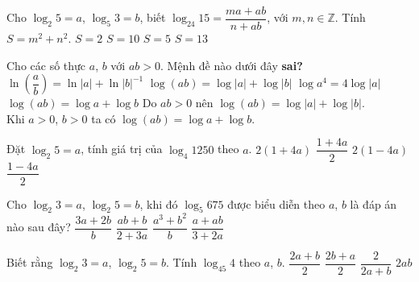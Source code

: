 \begin{ex}
	Cho $\log_2 5=a$, $\log_5 3=b$, biết $\log_{24} 15=\dfrac{ma+ab}{n+ab}$, với $m, n\in \mathbb{Z}$. Tính $S=m^2+n^2$.
	\choice
	{$S=2$}
	{\True $S=10$}
	{$S=5$}
	{$S=13$}
\end{ex}
\begin{ex}
	Cho các số thực $a$, $b$ với $ab>0$. Mệnh đề nào dưới đây \textbf{sai?}
	\choice
	{$\ln\left(\dfrac{a}{b}\right)=\ln|a|+\ln|b|^{-1}$}
	{$\log(ab)=\log|a|+\log|b|$}
	{$\log a^4=4\log|a|$}
	{\True $\log(ab)=\log a+\log b$}
	\loigiai
	{
		Do $ab>0$ nên $\log(ab)=\log|a|+\log|b|$.\\
		Khi $a>0$, $b>0$ ta có $\log(ab)=\log a+\log b$.
	}
\end{ex}

\begin{ex}
	Đặt $\log_2 5=a$, tính giá trị của $\log_4 1250$ theo $a$.
	\choice
	{$2(1+4a)$}
	{\True $\dfrac{1+4a}{2}$}
	{$2(1-4a)$}
	{$\dfrac{1-4a}{2}$}
\end{ex}
\begin{ex}
	Cho $\log_2 3 = a$, $\log_2 5 = b$, khi đó $\log_5 675$ được biểu diễn theo $a$, $b$ là đáp án nào sau đây?
	\choice
	{\True $\dfrac{3a + 2b}{b} $}
	{$ \dfrac{ab + b}{2+3a} $}
	{$ \dfrac{a^3 + b^2}{b} $}
	{ $\dfrac{a + ab}{3 + 2a}$ }
\end{ex}

\begin{ex}
	Biết rằng $\log_2 3=a$, $\log_2 5=b$. Tính $\log_{45} 4$ theo $a$, $b$.
	\choice
	{$\dfrac{2a+b}{2}$}
	{$\dfrac{2b+a}{2}$}
	{\True $\dfrac{2}{2a+b}$}
	{$2ab$}
\end{ex}

